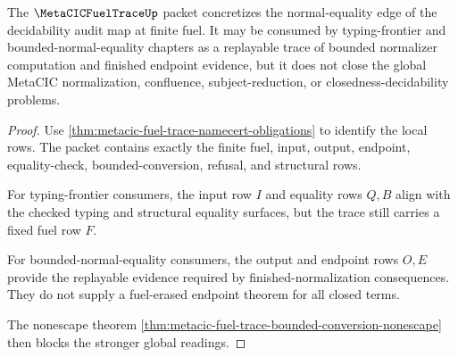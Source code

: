 \begin{theorem}
\label{thm:metacic-fuel-trace-audit-scope}
The $\MetaCICFuelTraceUp$ packet concretizes the normal-equality edge of the decidability audit map at finite fuel. It may be consumed by typing-frontier and bounded-normal-equality chapters as a replayable trace of bounded normalizer computation and finished endpoint evidence, but it does not close the global MetaCIC normalization, confluence, subject-reduction, or closedness-decidability problems.
\end{theorem}
\begin{proof}
Use \autoref{thm:metacic-fuel-trace-namecert-obligations} to identify the local rows. The packet contains exactly the finite fuel, input, output, endpoint, equality-check, bounded-conversion, refusal, and structural rows.

For typing-frontier consumers, the input row $I$ and equality rows $Q,B$ align with the checked typing and structural equality surfaces, but the trace still carries a fixed fuel row $F$.

For bounded-normal-equality consumers, the output and endpoint rows $O,E$ provide the replayable evidence required by finished-normalization consequences. They do not supply a fuel-erased endpoint theorem for all closed terms.

The nonescape theorem \autoref{thm:metacic-fuel-trace-bounded-conversion-nonescape} then blocks the stronger global readings.
\end{proof}


\begin{closurestatus}{\MetaCICFuelTraceUp}
  \theoryclosure{\seedClosure}
  \formalstatus{\unformalizedV}
\end{closurestatus}
